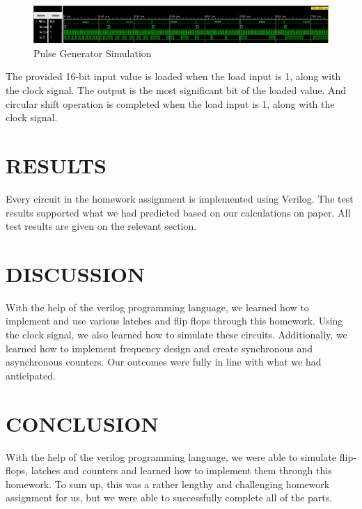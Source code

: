 \documentclass[pdftex,12pt,a4paper]{article}
\theoremstyle{plain}
\begin{document}
\begin{figure}[H]
	\centering
	\includegraphics[width=1\textwidth]{tests/test-Pulse Generator.png}
	\caption{Pulse Generator Simulation}
	\label{fig7}
\end{figure}

\begin{center}
The provided 16-bit input value is loaded when the load input is 1, along with the clock signal. The output is the most significant bit of the loaded value. And circular shift operation is completed when the load input is 1, along with the clock signal.
\end{center}

\section{RESULTS}
Every circuit in the homework assignment is implemented using Verilog. The test results supported what we had predicted based on our calculations on paper. All test results are given on the relevant section.

\section{DISCUSSION}
With the help of the verilog programming language, we learned how to implement and use various latches and flip flops through this homework. Using the clock signal, we also learned how to simulate these circuits. Additionally, we learned how to implement frequency design and create synchronous and asynchronous counters. Our outcomes were fully in line with what we had anticipated.

\section{CONCLUSION}
With the help of the verilog programming language, we were able to simulate flip-flops, latches and  counters and learned how to implement them through this homework. To sum up, this was a rather lengthy and challenging homework assignment for us, but we were able to successfully complete all of the parts.

\newpage
\end{document}
